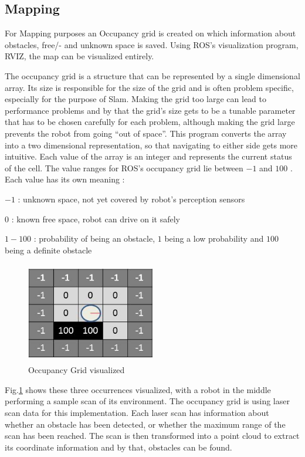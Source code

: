\documentclass{ba-kecs}
\begin{document}
\subsection{Mapping}\label{sec:mapping}

For Mapping purposes an Occupancy grid is created on which information about obstacles, free/- and unknown space is saved. Using ROS's visualization program, RVIZ, the map can be visualized entirely.

The occupancy grid is a structure that can be represented by a single dimensional array. Its size is responsible for the size of the grid and is often problem specific, especially for the purpose of Slam. Making the grid too large can lead to performance problems and by that the grid's size gets to be a tunable parameter that has to be chosen carefully for each problem, although making the grid large prevents the robot from going ``out of space''.
 This program converts the array into a two dimensional representation, so that navigating to either side gets more intuitive. Each value of the array is an integer and represents the current status of the cell. The value ranges for ROS's occupancy grid lie between $-1$ and $100$ \cite{occupancy}. Each value has its own meaning :

\begin{description}
\item{$-1$} : unknown space, not yet covered by robot's perception sensors
\item{$ 0$} : known free space, robot can drive on it safely
\item{$1-100$} : probability of being an obstacle, $1$ being a low probability and $100$ being a definite obstacle
\end{description}

\begin{figure}[htbp]
	\centering
		\includegraphics[width=0.50\textwidth,height = 44mm]{figures/Occup.png}
	\caption{Occupancy Grid visualized}
	\label{fig:Occupancy}
\end{figure}
Fig.\ref{fig:Occupancy} shows these three occurrences visualized, with a robot in the middle performing a sample scan of its environment.
The occupancy grid is using laser scan data for this implementation. Each laser scan has information about whether an obstacle has been detected, or whether the maximum range of the scan has been reached. The scan is then transformed into a point cloud to extract its coordinate information and by that, obstacles can be found.
\end{document}
